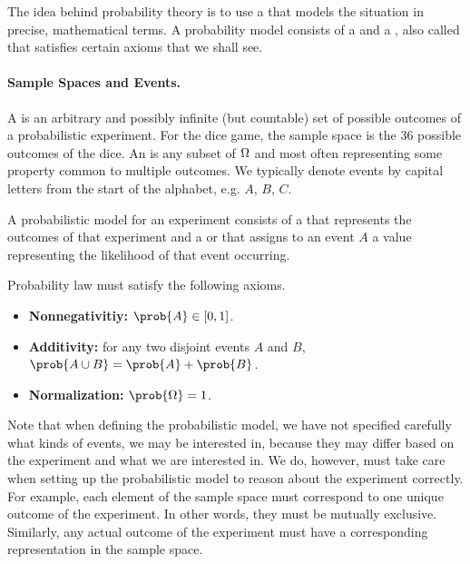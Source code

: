 {%
The idea behind probability theory is to use a  that models the situation in precise, mathematical terms.
%
A probability model consists of a  and a
, also called  that
satisfies certain axioms that we shall see.

\paragraph{Sample Spaces and Events.} 
A  \SSpace{} is an arbitrary and possibly infinite
(but countable) set of possible outcomes of a probabilistic
experiment. 
%
For the dice game, the sample space is the 36 possible outcomes of the
dice.  
%
An  is any subset of $\Omega$ and
most often representing some property common to multiple outcomes.  
%
We typically denote events by capital letters from the start
of the alphabet, e.g. $A$, $B$, $C$.


\begin{definition}
  A probabilistic model for an experiment consists of a  that represents the outcomes of that experiment and a
   or    that assigns to an event $A$ a value
  representing the likelihood of that event occurring.

Probability law must satisfy the following axioms.

\begin{itemize}
\item \textbf{Nonnegativitiy:} $\prob{A} \in [0,1]$.

\item \textbf{Additivity:} for any two disjoint events $A$ and $B$, $\prob{A \cup B} =
  \prob{A} + \prob{B}$.

\item \textbf{Normalization:} $\prob{\SSpace} = 1$.
\end{itemize}

\end{definition}

Note that when defining the probabilistic model, we have not specified
carefully what kinds of events, we may be interested in, because they
may differ based on the experiment and what we are interested in.
%
We do, however, must take care when setting up the probabilistic model
to reason about the experiment correctly. 
%
For example, each element of the sample space must correspond to one
unique outcome of the experiment.  In other words, they must be
mutually exclusive. 
%
Similarly, any actual outcome of the experiment must have a
corresponding representation in the sample space.

}
